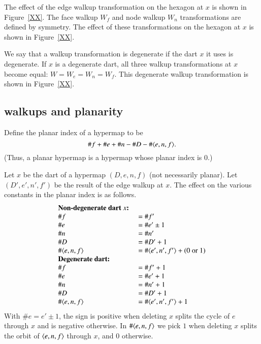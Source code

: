 The effect of the edge walkup transformation on the hexagon at $x$
is shown in Figure~\ref{XX}.  The face walkup $W_f$ and node walkup
$W_n$ transformations are defined by symmetry.  The effect of these
transformations on the hexagon at $x$ is shown in Figure~\ref{XX}.

We say that a walkup transformation is degenerate if the dart $x$ it
uses is degenerate.   If $x$ is a degenerate dart, all three walkup
transformations at $x$ become equal: $W=W_e=W_n=W_f$. This
degenerate walkup transformation is shown in Figure~\ref{XX}.

\subsection{walkups and planarity}

\begin{definition} Define the planar index of a hypermap to be
$$\# f + \# e + \# n - \# D - \# \langle e,n,f\rangle.$$
(Thus, a planar hypermap is a hypermap whose planar index is $0$.)
\end{definition}

\begin{lemma} Let $x$ be the dart of a hypermap $(D,e,n,f)$ (not necessarily
planar). Let $(D',e',n',f')$ be the result of the edge walkup at
$x$.  The effect on the various constants in the planar index is as
follows.
    $$
    \begin{array}{lll}
    \text{\bf Non-degenerate dart $x$: }&\\
    \# f &= \# f'\\
    \# e &= \# e' \pm 1\\
    \# n &= \# n'\\
    \# D &= \# D' + 1\\
    \# \langle e,n,f\rangle &= \#\langle e',n',f'\rangle + (0 \text{
    or 1})\\
    \text{\bf Degenerate dart:}&\\
    \# f &= \# f' +1\\
    \# e &= \# e' + 1\\
    \# n &= \# n' + 1\\
    \# D &= \# D' + 1\\
    \#\langle e,n,f\rangle &= \#\langle e',n',f'\rangle + 1
    \end{array}
    $$
With $\# e = e' \pm 1$, the sign is positive when deleting $x$
splits the cycle of $e$ through $x$ and is negative otherwise.  In
$\#\langle e,n,f\rangle$ we pick $1$ when deleting $x$ splits the orbit of
$\langle e,n,f\rangle$ through $x$, and $0$ otherwise.
\end{lemma}

